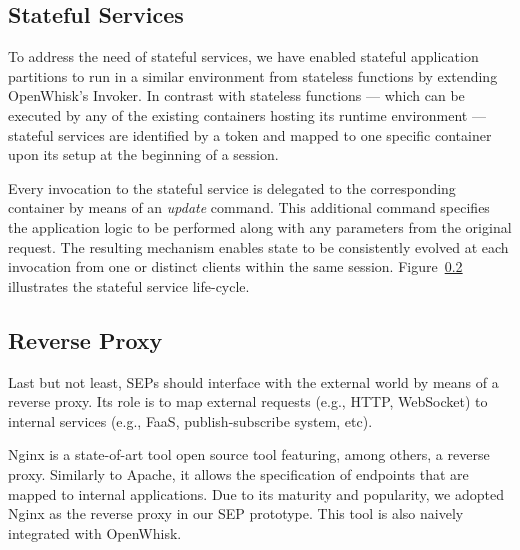 \subsection{Stateful Services}

To address the need of stateful services, we have enabled stateful application partitions to run in a similar environment from stateless functions by extending OpenWhisk's Invoker. In contrast with stateless functions --- which can be executed by any of the existing containers hosting its runtime environment --- stateful services are identified by a token and mapped to one specific container upon its setup at the beginning of a session. 

Every invocation to the stateful service is delegated to the corresponding container by means of an \textit{update} command. This additional command specifies the application logic to be performed along with any parameters from the original request. The resulting mechanism enables state to be consistently evolved at each invocation from one or distinct clients within the same session. Figure~\ref{} illustrates the stateful service life-cycle.

\subsection{Reverse Proxy}

Last but not least, SEPs should interface with the external world by means of a reverse proxy. Its role is to map external requests (e.g., HTTP, WebSocket) to internal services (e.g., FaaS, publish-subscribe system, etc). 

Nginx is a state-of-art tool open source tool featuring, among others, a reverse proxy. Similarly to Apache, it allows the specification of endpoints that are mapped to internal applications. Due to its maturity and popularity, we adopted Nginx as the reverse proxy in our SEP prototype. This tool is also naively integrated with OpenWhisk.


